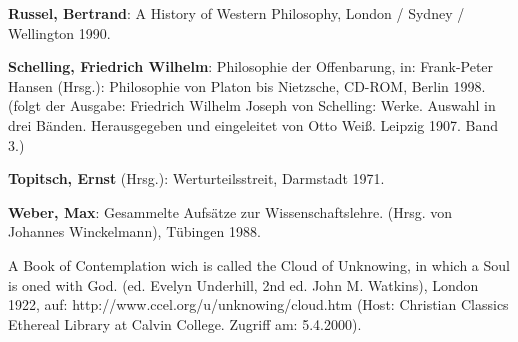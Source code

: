 {\bf Russel, Bertrand}: A History of Western Philosophy, London / Sydney /
Wellington 1990.

{\bf Schelling, Friedrich Wilhelm}: Philosophie der Offenbarung, in:
Frank-Peter Hansen (Hrsg.): Philosophie von Platon bis Nietzsche, CD-ROM,
Berlin 1998. (folgt der Ausgabe: Friedrich Wilhelm Joseph von Schelling:
Werke. Auswahl in drei Bänden. Herausgegeben und eingeleitet von Otto Weiß.
Leipzig 1907. Band 3.)

{\bf Topitsch, Ernst} (Hrsg.): Werturteilsstreit, Darmstadt 1971.

{\bf Weber, Max}: Gesammelte Aufsätze zur Wissenschaftslehre. (Hrsg. von
Johannes Winckelmann), Tübingen 1988. 

A Book of Contemplation wich is called the Cloud of Unknowing, in which a Soul
is oned with God. (ed. Evelyn Underhill, 2nd ed.  John M. Watkins), London
1922, auf: http://www.ccel.org/u/unknowing/cloud.htm (Host: Christian Classics
Ethereal Library at Calvin College. Zugriff am: 5.4.2000).










